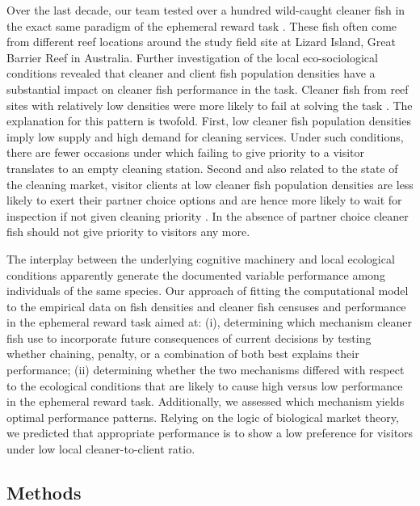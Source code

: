 \documentclass[]{rsos}%
\begin{document}
Over the last decade, our team tested over a hundred wild-caught
cleaner fish in the exact same paradigm of the ephemeral reward
task \citep{salwiczek_Adult_2012, wismer_Variation_2014, triki_Decrease_2018, triki_Biological_2019, triki_Brain_2020}. These fish often come from
different reef locations around the study field site at Lizard Island,
Great Barrier Reef in Australia. Further investigation of the local
eco-sociological conditions revealed that cleaner and client
fish population densities have a substantial impact on cleaner fish
performance in the task. Cleaner fish from reef sites with relatively
low densities were more likely to fail at solving the task \citep{triki_Biological_2019, triki_Decrease_2018, wismer_Variation_2014}. The explanation for this pattern
is twofold. First, low cleaner fish population densities imply
low supply and high demand for cleaning services.
Under such conditions, there are fewer occasions under
which failing to give priority to a visitor translates to an empty
cleaning station. Second and also related to the state of the cleaning market,
visitor clients at low cleaner fish population densities
are less likely to exert their partner choice options
and are hence more likely to wait for inspection if not given cleaning
priority \citep{triki_Brain_2020}. In the absence of partner choice
cleaner fish should not give priority to visitors any more.

The interplay between the underlying cognitive machinery and
local ecological conditions apparently generate the documented variable
performance among individuals of the same species.
Our approach of fitting the computational model to the empirical data on
fish densities and cleaner fish censuses and performance
in the ephemeral reward task aimed at: (i), determining which
mechanism cleaner fish use to incorporate future consequences of current
decisions by testing whether chaining, penalty, or a combination
of both best explains their performance; (ii) determining whether the
two mechanisms differed with respect to the ecological conditions
that are likely to cause high versus low performance in the
ephemeral reward task. Additionally, we assessed which mechanism
yields optimal performance patterns. Relying on the logic of
biological market theory, we predicted
that appropriate performance is to show a low preference for visitors under low
local cleaner-to-client ratio.

\hypertarget{methods}{%
\subsection{Methods}\label{methods}}
\end{document}
